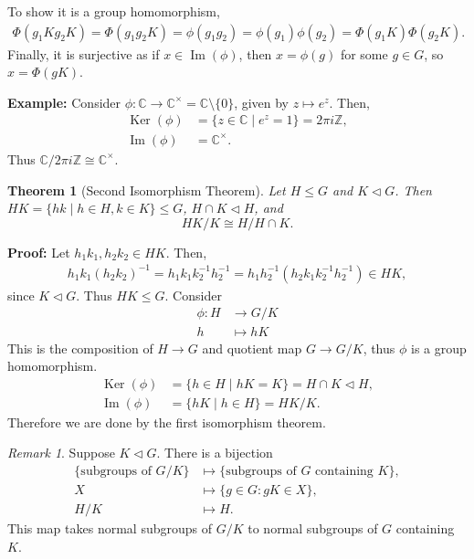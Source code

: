 \documentclass[12pt]{article}
\DeclareMathOperator{\Ker}{Ker}
\DeclareMathOperator{\Img}{Im}
\newtheorem{theorem}{Theorem}[section]
\theoremstyle{definition}
\theoremstyle{remark}
\newtheorem*{remark}{Remark}
\begin{document}
\begin{adjustbox}{minipage = \columnwidth - 25.5pt, margin=1em, frame=1pt, margin=0em}
To show it is a group homomorphism,
\begin{align*}
	\Phi(g_1Kg_2K) = \Phi(g_1g_2K) = \phi(g_1g_2) = \phi(g_1)\phi(g_2) = \Phi(g_1K)\Phi(g_2K).
\end{align*}
Finally, it is surjective as if $x \in \Img(\phi)$, then $x = \phi(g)$ for some $g \in G$, so $x = \Phi(gK)$.

\end{adjustbox}

\textbf{Example:} Consider $\phi : \mathbb{C} \to \mathbb{C}^{\times} = \mathbb{C} \setminus \{0\}$, given by $z \mapsto e^{z}$. Then,
\begin{align*}
	\Ker(\phi) &= \{z \in \mathbb{C} \mid e^{z} = 1\} = 2 \pi i \mathbb{Z}, \\
	\Img(\phi) &= \mathbb{C}^{\times}.
\end{align*}
Thus $\mathbb{C} / 2 \pi i \mathbb{Z} \cong \mathbb{C}^{\times}$.

\begin{theorem}[Second Isomorphism Theorem]
	Let $H \leq G$ and $K \lhd G$. Then $HK = \{hk \mid h \in H, k \in K\} \leq G$, $H \cap K \lhd H$, and
	\[
	HK / K \cong H / H \cap K
	.\] 
\end{theorem}

\begin{adjustbox}{minipage = \columnwidth - 25.5pt, margin=1em, frame=1pt, margin=0em}
\textbf{Proof:} Let $h_1k_1, h_2k_2 \in HK$. Then,
\begin{align*}
	h_1k_1(h_2k_2)^{-1} = h_1k_1k_2^{-1}h_2^{-1} = h_1h_2^{-1}(h_2k_1k_2^{-1}h_2^{-1}) \in HK,
\end{align*}
since $K \lhd G$. Thus $HK \leq G$. Consider
\begin{align*}
	\phi : H &\to G/K \\
	h &\mapsto hK
\end{align*}
This is the composition of $H \to G$ and quotient map $G \to G/K$, thus $\phi$ is a group homomorphism.
\begin{align*}
	\Ker(\phi) &= \{h \in H \mid hK = K\} = H \cap K \lhd H, \\
	\Img(\phi) &= \{hK \mid h \in H\} = HK/K.
\end{align*}
Therefore we are done by the first isomorphism theorem.

\end{adjustbox}

\begin{remark}
	Suppose $K \lhd G$. There is a bijection
	\begin{align*}
		\{\text{subgroups of } G/K\} &\mapsto \{\text{subgroups of } G \text{ containing }K\}, \\
		X &\mapsto \{g \in G : gK \in X\}, \\
		H/K &\mapsto H.
	\end{align*}
	This map takes normal subgroups of $G/K$ to normal subgroups of $G$ containing $K$.
\end{remark}
\end{document}
